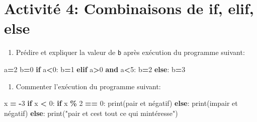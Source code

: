 \documentclass[
]{book}
\newenvironment{Shaded}{\begin{snugshade}}{\end{snugshade}}
\newcommand{\BuiltInTok}[1]{#1}
\newcommand{\ControlFlowTok}[1]{\textcolor[rgb]{0.13,0.29,0.53}{\textbf{#1}}}
\newcommand{\DecValTok}[1]{\textcolor[rgb]{0.00,0.00,0.81}{#1}}
\newcommand{\KeywordTok}[1]{\textcolor[rgb]{0.13,0.29,0.53}{\textbf{#1}}}
\newcommand{\NormalTok}[1]{#1}
\newcommand{\OperatorTok}[1]{\textcolor[rgb]{0.81,0.36,0.00}{\textbf{#1}}}
\newcommand{\StringTok}[1]{\textcolor[rgb]{0.31,0.60,0.02}{#1}}
\providecommand{\tightlist}{%
  \setlength{\itemsep}{0pt}\setlength{\parskip}{0pt}}
\def\tightlist{}
\begin{document}
\hypertarget{activituxe9-4-combinaisons-de-if-elif-else}{%
\section{Activité 4: Combinaisons de if, elif, else}\label{activituxe9-4-combinaisons-de-if-elif-else}}

\begin{enumerate}
\def\labelenumi{\arabic{enumi}.}
\tightlist
\item
  Prédire et expliquer la valeur de \texttt{b} après exécution du programme suivant:
\end{enumerate}

\begin{Shaded}
\begin{Highlighting}[]
\NormalTok{a}\OperatorTok{=}\DecValTok{2}
\NormalTok{b}\OperatorTok{=}\DecValTok{0}
\ControlFlowTok{if}\NormalTok{ a}\OperatorTok{\textless{}}\DecValTok{0}\NormalTok{:}
\NormalTok{    b}\OperatorTok{=}\DecValTok{1}
\ControlFlowTok{elif}\NormalTok{ a}\OperatorTok{\textgreater{}}\DecValTok{0} \KeywordTok{and}\NormalTok{ a}\OperatorTok{\textless{}}\DecValTok{5}\NormalTok{:}
\NormalTok{    b}\OperatorTok{=}\DecValTok{2}
\ControlFlowTok{else}\NormalTok{:}
\NormalTok{    b}\OperatorTok{=}\DecValTok{3}
\end{Highlighting}
\end{Shaded}

\begin{enumerate}
\def\labelenumi{\arabic{enumi}.}
\setcounter{enumi}{1}
\tightlist
\item
  Commenter l'exécution du programme suivant:
\end{enumerate}

\begin{Shaded}
\begin{Highlighting}[]
\NormalTok{x }\OperatorTok{=} \OperatorTok{{-}}\DecValTok{3}
\ControlFlowTok{if}\NormalTok{ x }\OperatorTok{\textless{}} \DecValTok{0}\NormalTok{:}
  \ControlFlowTok{if}\NormalTok{ x }\OperatorTok{\%} \DecValTok{2} \OperatorTok{==} \DecValTok{0}\NormalTok{:}
    \BuiltInTok{print}\NormalTok{(}\StringTok{\textquotesingle{}pair et négatif\textquotesingle{}}\NormalTok{)}
  \ControlFlowTok{else}\NormalTok{: }
    \BuiltInTok{print}\NormalTok{(}\StringTok{\textquotesingle{}impair et négatif\textquotesingle{}}\NormalTok{)}
\ControlFlowTok{else}\NormalTok{:}
    \BuiltInTok{print}\NormalTok{(}\StringTok{"pair et c\textquotesingle{}est tout ce qui m\textquotesingle{}intéresse"}\NormalTok{)}
\end{Highlighting}
\end{Shaded}
\end{document}
